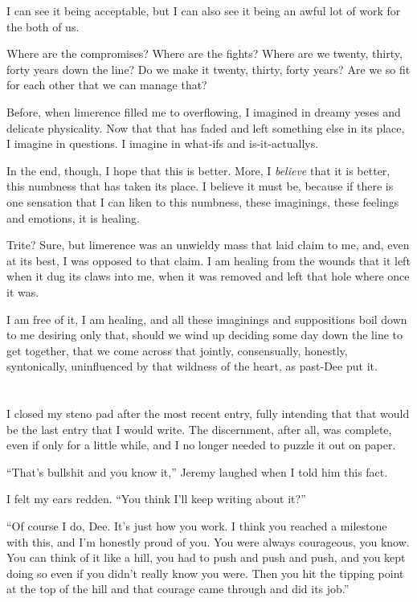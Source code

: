 I can see it being acceptable, but I can also see it being an awful lot of work for the both of us.

Where are the compromises? Where are the fights? Where are we twenty, thirty, forty years down the line? Do we make it twenty, thirty, forty years? Are we so fit for each other that we can manage that?

Before, when limerence filled me to overflowing, I imagined in dreamy yeses and delicate physicality. Now that that has faded and left something else in its place, I imagine in questions. I imagine in what-ifs and is-it-actuallys.

In the end, though, I hope that this is better. More, I \emph{believe} that it is better, this numbness that has taken its place. I believe it must be, because if there is one sensation that I can liken to this numbness, these imaginings, these feelings and emotions, it is healing.

Trite? Sure, but limerence was an unwieldy mass that laid claim to me, and, even at its best, I was opposed to that claim. I am healing from the wounds that it left when it dug its claws into me, when it was removed and left that hole where once it was.

I am free of it, I am healing, and all these imaginings and suppositions boil down to me desiring only that, should we wind up deciding some day down the line to get together, that we come across that jointly, consensually, honestly, syntonically, uninfluenced by that wildness of the heart, as past-Dee put it.

\section{}

I closed my steno pad after the most recent entry, fully intending that that would be the last entry that I would write. The discernment, after all, was complete, even if only for a little while, and I no longer needed to puzzle it out on paper.

``That's bullshit and you know it,'' Jeremy laughed when I told him this fact.

I felt my ears redden. ``You think I'll keep writing about it?''

``Of course I do, Dee. It's just how you work. I think you reached a milestone with this, and I'm honestly proud of you. You were always courageous, you know. You can think of it like a hill, you had to push and push and push, and you kept doing so even if you didn't really know you were. Then you hit the tipping point at the top of the hill and that courage came through and did its job.''

